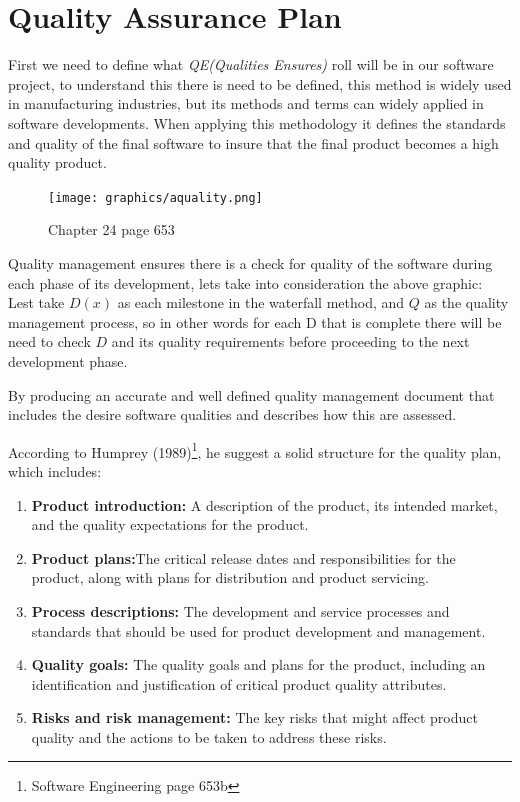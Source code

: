 \section*{Quality Assurance Plan}


First we need to define what \textit{QE(Qualities Ensures)}  roll will be in our software project, to understand this there is need to be defined,  this method is widely used in manufacturing industries, but its methods and terms can widely applied in software developments. When applying this methodology  it defines the standards and quality of the final software to insure that the final product becomes a high quality product.

\begin{figure}[ht!]
\centering
\texttt{[image: graphics/aquality.png]}
\caption{Chapter 24 page 653}
\label{overflow}
\end{figure}


Quality management ensures there is a check for quality of the software during each phase of its development,  lets take into consideration the above graphic: Lest take $D(x)$ as each milestone in the waterfall method, and $Q$ as the quality management process, so in other words for each D that is complete there will be need to check $D$ and its quality requirements before proceeding to the next development phase.


By producing an accurate and well defined quality management document that includes the desire software qualities and describes how this are assessed. 

According to Humprey (1989)\footnote{Software Engineering page 653b
}, he suggest a solid structure for the quality plan, which includes:

\begin{enumerate}
	\item \textbf{Product introduction:} A description of the product, its intended market, and the quality expectations for the product.
	\item \textbf{Product plans:}The critical release dates and responsibilities for the product, along with plans for distribution and product servicing.
	\item \textbf{Process descriptions:} The development and service processes and standards that should be used for product development and management.
	\item \textbf{Quality goals:} The quality goals and plans for the product, including an identification and justification of critical product quality attributes. 
	\item \textbf{Risks and risk management:} The key risks that might affect product quality and the actions to be taken to address these risks.
\end{enumerate}


